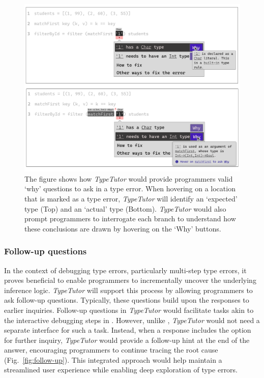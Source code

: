 \begin{figure}[hbt]
  \includegraphics[width=\linewidth]{Why}
  \caption[An example of \textit{TypeTutor} providing explanation (`why' questions)]{
      \label{fig:why}
      The figure shows how \textit{TypeTutor} would provide programmers valid `why' questions to ask in a type error. When hovering on a location that is marked as a type error, \textit{TypeTutor} will identify an `expected' type (Top) and an `actual' type (Bottom). \textit{TypeTutor} would also prompt programmers to interrogate each branch to understand how these conclusions are drawn by hovering on the `Why' buttons. 
    }
\end{figure}



\subsubsection*{Follow-up questions}

In the context of debugging type errors, particularly multi-step type errors, it proves beneficial to enable programmers to incrementally uncover the underlying inference logic. \textit{TypeTutor} will support this process by allowing programmers to ask follow-up questions. Typically, these questions build upon the responses to earlier inquiries. Follow-up questions in \textit{TypeTutor} would facilitate tasks akin to the interactive debugging steps in \chameleon{}. However, unlike \chameleon{}, \textit{TypeTutor} would not need a separate interface for such a task. Instead, when a response includes the option for further inquiry, \textit{TypeTutor} would provide a follow-up hint at the end of the answer, encouraging programmers to continue tracing the root cause (Fig.~\ref{fig:follow-up}). This integrated approach would help maintain a streamlined user experience while enabling deep exploration of type errors.


